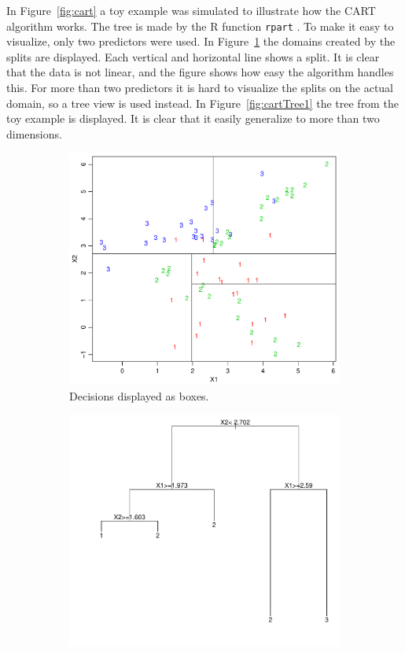 In Figure~\ref{fig:cart} a toy example was simulated to illustrate how the CART algorithm works. The tree is made by the R function \verb+rpart+ \cite{rpart}. To make it easy to visualize, only two predictors were used. 
In Figure~\ref{fig:cartAreas1} the domains created by the splits are displayed. Each vertical and horizontal line shows a split. It is clear that the data is not linear, and the figure shows how easy the algorithm handles this.
For more than two predictors it is hard to visualize the splits on the actual domain, so a tree view is used instead.
 In Figure~\ref{fig:cartTree1} the tree from the toy example is displayed. It is clear that it easily generalize to more than two dimensions. \\
%
\begin{figure}[h!]
  \centering
  \begin{subfigure}[b]{0.48\textwidth}
    \includegraphics[width=\textwidth]{./figures/cartAreas1.pdf}
    \caption{Decisions displayed as boxes.}
    \label{fig:cartAreas1}
  \end{subfigure}%
  \quad
  \begin{subfigure}[b]{0.48\textwidth}
    \includegraphics[width=\textwidth]{./figures/cartTree1.pdf}

\end{subfigure}
\end{figure}
